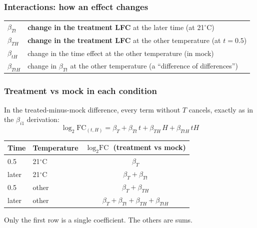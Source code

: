 \documentclass{beamer}
\begin{document}
\begin{frame}
\frametitle{Interactions: how an effect changes}
\small
\renewcommand{\arraystretch}{1.6}
\begin{tabular}{@{}ll@{}}
$\beta_{Tt}$ & \textbf{change in the treatment LFC} at the later time (at 21$^\circ$C) \\
$\beta_{TH}$ & \textbf{change in the treatment LFC} at the other temperature (at $t=0.5$) \\
$\beta_{tH}$ & change in the time effect at the other temperature (in mock) \\
$\beta_{TtH}$ & change in $\beta_{Tt}$ at the other temperature (a ``difference of differences'') \\
\end{tabular}

\end{frame}

\begin{frame}
\frametitle{Treatment vs mock in each condition}

In the treated-minus-mock difference, every term without $T$ cancels, exactly as in the $\beta_{i1}$ derivation:
\[
\log_2\text{FC}_{(t,H)} = \beta_T + \beta_{Tt}\,t + \beta_{TH}\,H + \beta_{TtH}\,tH
\]

\vspace{0.2cm}
\begin{center}
\renewcommand{\arraystretch}{1.3}
\begin{tabular}{llc}
\hline
Time & Temperature & $\log_2\text{FC}$ (treatment vs mock) \\
\hline
0.5 & 21$^\circ$C & $\beta_T$ \\
later & 21$^\circ$C & $\beta_T + \beta_{Tt}$ \\
0.5 & other & $\beta_T + \beta_{TH}$ \\
later & other & $\beta_T + \beta_{Tt} + \beta_{TH} + \beta_{TtH}$ \\
\hline
\end{tabular}
\end{center}

\vspace{0.2cm}
\alert{Only the first row is a single coefficient. The others are sums.}
\end{frame}
\end{document}
